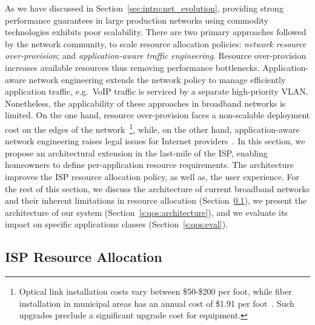 As we have discussed in Section~\ref{sec:intro:net_evolution}, providing strong
performance guarantees in large production networks using commodity technologies
exhibits poor scalability. There are two primary approaches followed by the network
community, to scale resource allocation policies: \emph{network resource
  over-provision}; and \emph{application-aware traffic engineering}.  Resource
over-provision increases available resources thus removing performance
bottlenecks. Application-aware network engineering extends the network
policy to  manage efficiently application traffic, e.g.~VoIP traffic is serviced
by a separate high-priority VLAN\@. Nonetheless, the applicability of these
approaches in broadband networks is limited. On the one hand, resource
over-provision faces a non-scalable deployment cost on the edges of the
network~\footnote{Optical link installation costs vary between \$50-\$200 per
  foot, while fiber installation in municipal areas has an annual cost of \$1.91
  per foot~. Such upgrades preclude a significant upgrade
  cost for equipment.}, while, on the other hand, application-aware network
engineering raises legal issues for Internet providers~. In this
section, we propose an architectural extension in the last-mile of the ISP,
enabling homeowners to define per-application resource requirements.  The
architecture improves the ISP resource allocation policy, as well as, the user
experience.  For the rest of this section, we discuss the architecture of
current broadband networks and their  inherent limitations in resource allocation
(Section~\ref{s:qos:motivation}), we present the architecture of our
system (Section~\ref{s:qos:architecture}), and we evaluate its impact on specific
applications classes (Section~\ref{s:qos:eval}).

\subsection{ISP Resource Allocation} \label{s:qos:motivation}

